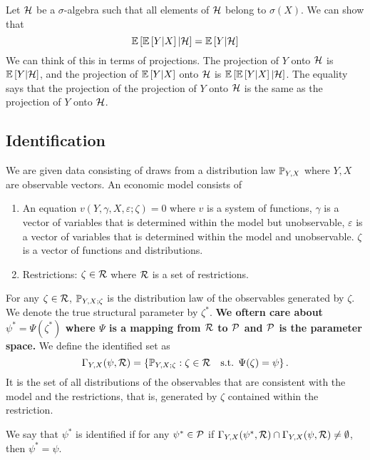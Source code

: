 \begin{exercise}
    Let $\mathcal{H}$ be a $\sigma$-algebra such that all elements of $\mathcal{H}$  belong to $\sigma(X)$. We can show that \begin{equation*}
        \mathbb{E}\left[\mathbb{E}\left[Y|X\right]|\mathcal{H}\right] = \mathbb{E}\left[Y|\mathcal{H}\right]
    \end{equation*}
    We can think of this in terms of projections. The projection of $Y$ onto $\mathcal{H}$ is $\mathbb{E}\left[Y|\mathcal{H}\right]$, and the projection of $\mathbb{E}\left[Y|X\right]$ onto $\mathcal{H}$ is $\mathbb{E}\left[\mathbb{E}\left[Y|X\right]|\mathcal{H}\right]$. The equality says that the projection of the projection of $Y$ onto $\mathcal{H}$ is the same as the projection of $Y$ onto $\mathcal{H}$.
\end{exercise}
\subsection{Identification}
We are given data consisting of draws from a distribution law $\mathbb{P}_{Y,X}$ where
$Y,X$ are observable vectors. An economic model consists of
\begin{enumerate}
    \item An equation $v(Y,\gamma,X,\varepsilon;\zeta)=0$ where $v$ is a system of
          functions, $\gamma$ is a vector of variables that is determined within the
          model but unobservable, $\varepsilon$ is a vector of variables that is
          determined within the model and unobservable. $\zeta$ is a vector of functions
          and distributions.
    \item Restrictions: $\zeta \in \mathcal{R}$ where $\mathcal{R}$ is a set of restrictions.
\end{enumerate}
For any $\zeta \in \mathcal{R}$, $\mathbb{P}_{Y,X;\zeta}$ is the distribution law of the observables generated by $\zeta$. We denote the true structural parameter by $\zeta^*$. \textbf{We oftern care about $\psi^*=\Psi(\zeta^*)$ where $\Psi$ is a mapping from $\mathcal{R}$ to $\mathcal{P}$ and $\mathcal{P}$ is the parameter space.}
We define the identified set as
\begin{equation*}
    \Gamma_{Y,X}(\psi,\mathcal{R}) = \left\{\mathbb{P}_{Y,X;\zeta}:\zeta \in \mathcal{R} \quad \text{s.t. }\Psi(\zeta)=\psi\right\}.
\end{equation*} It is the set of all distributions of the observables that are consistent with the model and the restrictions, that is, generated by $\zeta$ contained within the restriction.
\begin{definition}[Identification]
    We say that $\psi^*$ is identified if for any $\psi^* \in \mathcal{P}$ if $ \Gamma_{Y,X}(\psi^*,\mathcal{R}) \cap \Gamma_{Y,X}(\psi,\mathcal{R}) \neq \emptyset$, then $\psi^*=\psi$.
\end{definition}
